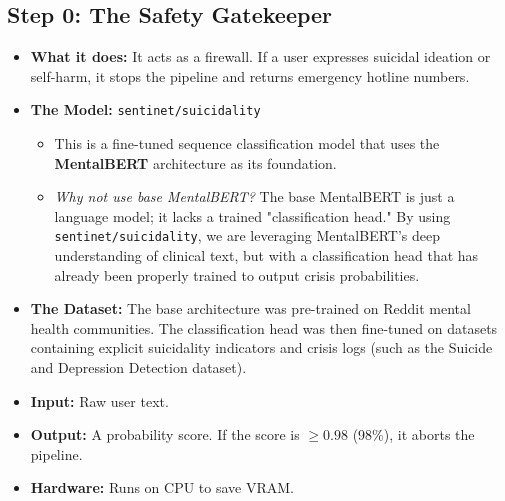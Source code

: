 \documentclass[12pt,a4paper]{article}
\begin{document}
\subsection{Step 0: The Safety Gatekeeper}
\begin{itemize}
    \item \textbf{What it does:} It acts as a firewall. If a user expresses suicidal ideation or self-harm, it stops the pipeline and returns emergency hotline numbers.
    \item \textbf{The Model:} \texttt{sentinet/suicidality}
    \begin{itemize}
        \item This is a fine-tuned sequence classification model that uses the \textbf{MentalBERT} architecture as its foundation. 
        \item \textit{Why not use base MentalBERT?} The base MentalBERT is just a language model; it lacks a trained "classification head." By using \texttt{sentinet/suicidality}, we are leveraging MentalBERT's deep understanding of clinical text, but with a classification head that has already been properly trained to output crisis probabilities.
    \end{itemize}
    \item \textbf{The Dataset:} The base architecture was pre-trained on Reddit mental health communities. The classification head was then fine-tuned on datasets containing explicit suicidality indicators and crisis logs (such as the Suicide and Depression Detection dataset).
    \item \textbf{Input:} Raw user text.
    \item \textbf{Output:} A probability score. If the score is $\ge 0.98$ (98\%), it aborts the pipeline.
    \item \textbf{Hardware:} Runs on CPU to save VRAM.
\end{itemize}
\end{document}
